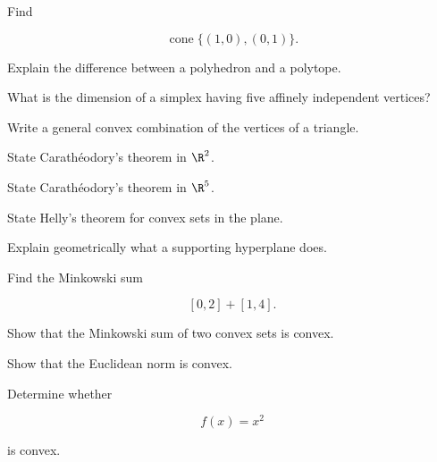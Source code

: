 \begin{exercise}[2]
Find

\[
\operatorname{cone}\{(1,0),(0,1)\}.
\]
\end{exercise}

\begin{exercise}[2]
Explain the difference between a polyhedron and a polytope.
\end{exercise}

\begin{exercise}[2]
What is the dimension of a simplex having five affinely independent
vertices?
\end{exercise}

\begin{exercise}[2]
Write a general convex combination of the vertices of a triangle.
\end{exercise}

\begin{exercise}[2]
State Carath\'eodory's theorem in \(\R^2\).
\end{exercise}

\begin{exercise}[2]
State Carath\'eodory's theorem in \(\R^5\).
\end{exercise}

\begin{exercise}[2]
State Helly's theorem for convex sets in the plane.
\end{exercise}

\begin{exercise}[2]
Explain geometrically what a supporting hyperplane does.
\end{exercise}

\begin{exercise}[2]
Find the Minkowski sum

\[
[0,2]+[1,4].
\]
\end{exercise}

\begin{exercise}[2]
Show that the Minkowski sum of two convex sets is convex.
\end{exercise}

\begin{exercise}[2]
Show that the Euclidean norm is convex.
\end{exercise}

\begin{exercise}[2]
Determine whether

\[
f(x)=x^2
\]

is convex.
\end{exercise}


